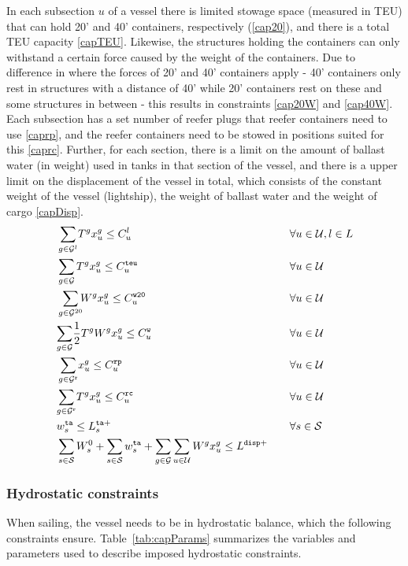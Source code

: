 In each subsection $u$ of a vessel there is limited stowage space (measured in TEU) that can hold 20' and 40' containers, respectively (\ref{cap20}), and there is a total TEU capacity \eqref{capTEU}. Likewise, the structures holding the containers can only withstand a certain force caused by the weight of the containers. Due to difference in where the forces of 20' and 40' containers apply - 40' containers only rest in structures with a distance of 40' while 20' containers rest on these and some structures in between - this results in constraints \eqref{cap20W} and \eqref{cap40W}.
Each subsection has a set number of reefer plugs that reefer containers need to use \eqref{caprp}, and the reefer containers need to be stowed in positions suited for this \eqref{caprc}.
Further, for each section, there is a limit on the amount of ballast water (in weight) used in tanks in that section of the vessel, and there is a upper limit on the displacement of the vessel in total, which consists of the constant weight of the vessel (lightship), the weight of ballast water and the weight of cargo \eqref{capDisp}.
\begin{alignat}{4}
&	\so[r]{\sum_{g\in \mc{G}^{l}}}T^gx^{g}_{u}\leq C^{l}_{u}   					&& \forall u\in \mc{U}, l\in L\label{cap20}\\
&	\so[r]{\sum_{g\in \mc{G}}}T^gx^{g}_{u} \leq C^\ttt{teu}_{u} 				&& \forall u\in \mc{U}\label{capTEU}\\
&	\so[r]{\sum_{g\in \mc{G}^{20}}}W^gx^{g}_{u}\leq C^\ttt{w20}_{u}    	&& \forall u\in \mc{U}\label{cap20W}\\
&	{\sum_{g\in \mc{G}}}\frac{1}{2}T^gW^gx^{g}_{u} \leq C^\ttt{w}_{u}		&& \forall u\in \mc{U}\label{cap40W}\\
&	\so[r]{\sum_{g\in \mc{G}^\ttt{r}}}x^{g}_{u}\leq C^\ttt{rp}_{u}			&& \forall u\in \mc{U}\label{caprp}\\
&	{\sum_{g\in \mc{G}^\ttt{r}}}T^gx^{g}_{u} \leq C^\ttt{rc}_{u} 				&& \forall u\in \mc{U}\label{caprc}\\
& w^{\ttt{ta}}_s \leq L^{\ttt{ta}+}_s																	&& \forall s\in \mc{S}\label{capballast}\\
& \sum_{s\in\mc{S}}W^0_s + \sum_{s\in\mc{S}} w^\ttt{ta}_s + \sum_{g\in \mc{G}}\sum_{u\in\mc{U}}W^g x^g_u\leq L^{\ttt{disp}+}\quad \label{capDisp}
\end{alignat}

\subsubsection{Hydrostatic constraints}
When sailing, the vessel needs to be in hydrostatic balance, which the following constraints ensure. Table~\ref{tab:capParams} summarizes the variables and parameters used to describe imposed hydrostatic constraints.

